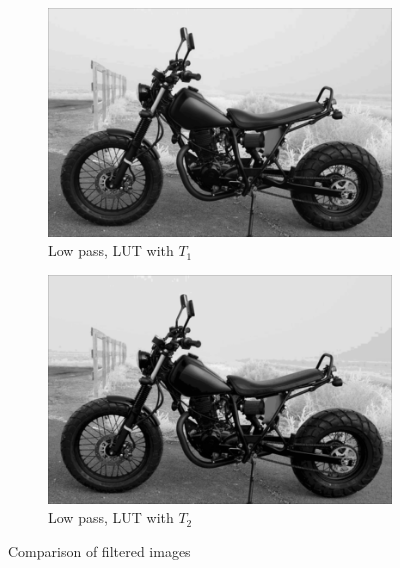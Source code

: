 \documentclass{beamer}
\begin{document}
\begin{frame}
\begin{figure}[h]
\begin{subfigure}[b]{0.4\textwidth} \includegraphics[width=\textwidth]{motor_lut_121.png} \caption{Low pass, LUT with $T_1$} %
\end{subfigure}
\begin{subfigure}[b]{0.4\textwidth} \includegraphics[width=\textwidth]{motor_lut_242.png} \caption{Low pass, LUT with $T_2$} \end{subfigure}
\caption{Comparison of filtered images}
\end{figure}
\end{frame}
\end{document}
